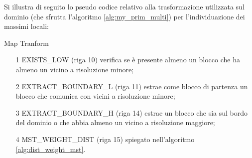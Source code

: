 {Si illustra di seguito lo pseudo codice relativo alla trasformazione utilizzata sul dominio (che sfrutta l'algoritmo \ref{alg:my_prim_multi}) per l'individuazione dei massimi locali:
\begin{algorithm}[H]
	\caption{Map Tranform}
	\label{alg:my_map_transfor}
	\begin{algorithmic}[1]
		\Statex
		\State{\color{blue}{//Inizializzazione di tutti i vertici}}
		\EndFor
		
		\State{\color{blue}{//Si analizza il grafo un livello di risoluzione alla volta}}		
		\Else
		\EndIf
		\EndWhile
		\EndWhile
		\State \Return{}
		\EndFunction
	\end{algorithmic}
\end{algorithm}
\begin{itemize}
\color{orange}\item[1]\color{black}EXISTS\_LOW (riga 10) verifica se è presente almeno un blocco che ha almeno un vicino a risoluzione minore;
\color{orange}\item[2]\color{black}EXTRACT\_BOUNDARY\_L (riga 11) estrae come blocco di partenza un blocco che comunica con vicini a risoluzione minore;
\color{orange}\item[3]\color{black}EXTRACT\_BOUNDARY\_H (riga 14) estrae un blocco che sia sul bordo del dominio o che abbia almeno un vicino a risoluzione maggiore;
\color{orange}\item[4]\color{black}MST\_WEIGHT\_DIST (riga 15) spiegato nell'algoritmo \ref{alg:dist_weight_mst}.
\end{itemize}

}
